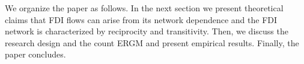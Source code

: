 \documentclass[reqno,onecolumn,letterpaper,12pt]{article}
\begin{document}
We organize the paper as follows. In the next section %
we present theoretical claims that FDI flows can arise from its network dependence and the FDI network is characterized by reciprocity and transitivity. Then, we discuss the research design and the count ERGM and present empirical results. Finally, the paper concludes.








\end{document}
